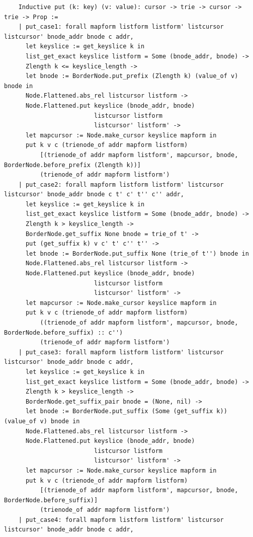 \documentclass[runningheads]{llncs}
\begin{document}
\begin{verbatim}
    Inductive put (k: key) (v: value): cursor -> trie -> cursor -> trie -> Prop :=
    | put_case1: forall mapform listform listform' listcursor listcursor' bnode_addr bnode c addr,
      let keyslice := get_keyslice k in
      list_get_exact keyslice listform = Some (bnode_addr, bnode) ->
      Zlength k <= keyslice_length ->
      let bnode := BorderNode.put_prefix (Zlength k) (value_of v) bnode in
      Node.Flattened.abs_rel listcursor listform ->
      Node.Flattened.put keyslice (bnode_addr, bnode)
                         listcursor listform
                         listcursor' listform' ->
      let mapcursor := Node.make_cursor keyslice mapform in
      put k v c (trienode_of addr mapform listform)
          [(trienode_of addr mapform listform', mapcursor, bnode, BorderNode.before_prefix (Zlength k))]
          (trienode_of addr mapform listform')
    | put_case2: forall mapform listform listform' listcursor listcursor' bnode_addr bnode c t' c' t'' c'' addr,
      let keyslice := get_keyslice k in
      list_get_exact keyslice listform = Some (bnode_addr, bnode) ->
      Zlength k > keyslice_length ->
      BorderNode.get_suffix None bnode = trie_of t' ->
      put (get_suffix k) v c' t' c'' t'' ->
      let bnode := BorderNode.put_suffix None (trie_of t'') bnode in
      Node.Flattened.abs_rel listcursor listform ->
      Node.Flattened.put keyslice (bnode_addr, bnode)
                         listcursor listform
                         listcursor' listform' ->
      let mapcursor := Node.make_cursor keyslice mapform in
      put k v c (trienode_of addr mapform listform)
          ((trienode_of addr mapform listform', mapcursor, bnode, BorderNode.before_suffix) :: c'')
          (trienode_of addr mapform listform')
    | put_case3: forall mapform listform listform' listcursor listcursor' bnode_addr bnode c addr,
      let keyslice := get_keyslice k in
      list_get_exact keyslice listform = Some (bnode_addr, bnode) ->
      Zlength k > keyslice_length ->
      BorderNode.get_suffix_pair bnode = (None, nil) ->
      let bnode := BorderNode.put_suffix (Some (get_suffix k)) (value_of v) bnode in
      Node.Flattened.abs_rel listcursor listform ->
      Node.Flattened.put keyslice (bnode_addr, bnode)
                         listcursor listform
                         listcursor' listform' ->
      let mapcursor := Node.make_cursor keyslice mapform in
      put k v c (trienode_of addr mapform listform)
          [(trienode_of addr mapform listform', mapcursor, bnode, BorderNode.before_suffix)]
          (trienode_of addr mapform listform')
    | put_case4: forall mapform listform listform' listcursor listcursor' bnode_addr bnode c addr,

\end{verbatim}
\end{document}
